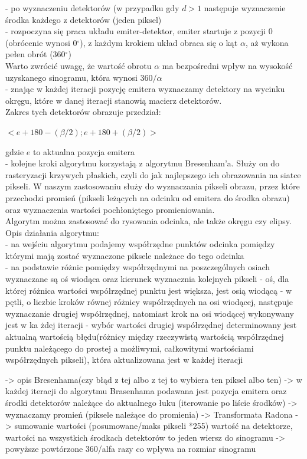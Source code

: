 \documentclass[A_4paper,12pt]{article}
\begin{document}
\begin{itemize}
- po wyznaczeniu detektorów (w przypadku gdy $d>1$ następuje wyznaczenie środka każdego z detektorów (jeden piksel) \\
- rozpoczyna się praca układu emiter-detektor, emiter startuje z pozycji 0 (obrócenie wynosi 0$^\circ$), z każdym krokiem układ obraca się o kąt $\alpha$, aż wykona pełen obrót (360$^\circ$) \\ Warto zwrócić uwagę, że wartość obrotu $\alpha$ ma bezpośredni wpływ na wysokość uzyskanego sinogramu, która wynosi $360/\alpha$ \\
- znając w każdej iteracji pozycję emitera wyznaczamy detektory na wycinku okręgu, które w danej iteracji stanowią macierz detektorów. \\
Zakres tych detektorów obrazuje przedział:
\begin{center}
$<e + 180 - (\beta/2) ; e + 180 + (\beta/2)>$
\end{center}
gdzie $e$ to aktualna pozycja emitera\\
- kolejne kroki algorytmu korzystają z algorytmu Bresenham'a. 
Służy on do rasteryzacji krzywych płaskich, czyli do jak najlepszego ich obrazowania na siatce pikseli.
W naszym zastosowaniu służy do wyznaczania pikseli obrazu, przez które przechodzi promień (pikseli leżących na odcinku od emitera do środka obrazu) oraz wyznaczenia wartości pochłoniętego promieniowania. \\
Algorytm można zastosować do rysowania odcinka, ale także okręgu czy elipsy. \\
Opis działania algorytmu: \\
- na wejściu algorytmu podajemy współrzędne punktów odcinka pomiędzy którymi mają zostać wyznaczone piksele należace do tego odcinka \\
- na podstawie różnic pomiędzy współrzędnymi na poszczególnych osiach wyznaczane są oś wiodąca oraz kierunek wyznacznia kolejnych pikseli
- oś, dla której różnica wartości współrzędnej punktu jest większa, jest osią wiodącą
- w pętli, o liczbie kroków równej różnicy współrzędnych na osi wiodącej, następuje wyznaczanie drugiej współrzędnej, natomiast krok na osi wiodącej wykonywany jest w ka żdej iteracji
- wybór wartości drugiej współrzędnej determinowany jest aktualną wartością błędu(różnicy między rzeczywistą wartością współrzędnej punktu należącego do prostej a możliwymi, całkowitymi wartościami współrzędnych pikseli), która aktualizowana jest w każdej iteracji

 -> opis Bresenhama(czy błąd z tej albo z tej to wybiera ten piksel albo ten) -> w każdej iteracji do algorytmu Brasenhama podawana jest pozycja emitera oraz środki detektorów należące do aktualnego łuku (iterowanie po liście środków) -> wyznaczamy promień (piksele należące do promienia) -> Transformata Radona -> sumowanie wartości (posumowane/maks pikseli *255) wartość na detektorze, wartości na wszystkich środkach detektorów to jeden wiersz do sinogramu -> powyższe powtórzone 360/alfa razy co wpływa na rozmiar sinogramu 


\end{itemize}
\end{document}
